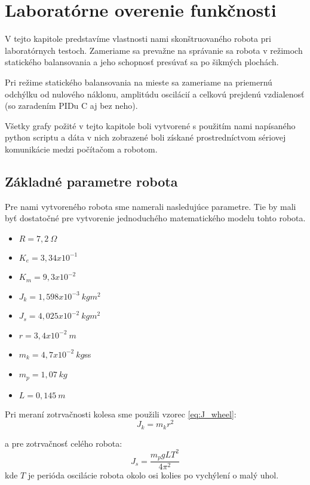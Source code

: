 \chapter{Laboratórne overenie funkčnosti}

V tejto kapitole predstavíme vlastnosti nami skonštruovaného robota pri laboratórnych testoch. Zameriame sa prevažne na správanie sa robota v režimoch statického balansovania a jeho schopnosť presúvať sa po šikmých plochách.

Pri režime statického balansovania na mieste sa zameriame na priemernú odchýlku od nulového náklonu, amplitúdu oscilácií a celkovú prejdenú vzdialenosť (so zaradením PIDu C aj bez neho).

Všetky grafy požité v tejto kapitole boli vytvorené s použitím nami napísaného python scriptu a dáta v nich zobrazené boli získané prostredníctvom sériovej komunikácie medzi počítačom a robotom.  

\section{Základné parametre robota}
Pre nami vytvoreného robota sme namerali nasledujúce parametre. Tie by mali byť dostatočné pre vytvorenie jednoduchého matematického modelu tohto robota.

\begin{multicols}{2}
\begin{itemize}
\item{$R = 7,2 ~\Omega$}
\item{$K_e = 3,34x10^{-1}$}
\item{$K_m = 9,3x10^{-2}$}
\item{$J_k = 1,598x10^{-3}~ kgm^{2}$}
\item{$J_s = 4,025x10^{-2}~ kgm^{2}$}
\item{$r = 3,4x10^{-2}~ m$}
\item{$m_k = 4,7x10^{-2}~ kg$ss}
\item{$m_p = 1,07 ~kg$}
\item{$L = 0,145 ~m$}
\end{itemize}
\end{multicols}

Pri meraní zotrvačnosti kolesa sme použili vzorec \ref{eq:J_wheel}:
\begin{equation}
J_k = m_kr^2
\label{eq:J_wheel}
\end{equation}

a pre zotrvačnosť celého robota:
\begin{equation}
J_s = \dfrac{m_pgLT^2}{4\pi^2}
\label{eq:J_robot}
\end{equation}
kde $T$ je perióda oscilácie robota okolo osi kolies po vychýlení o malý uhol.


